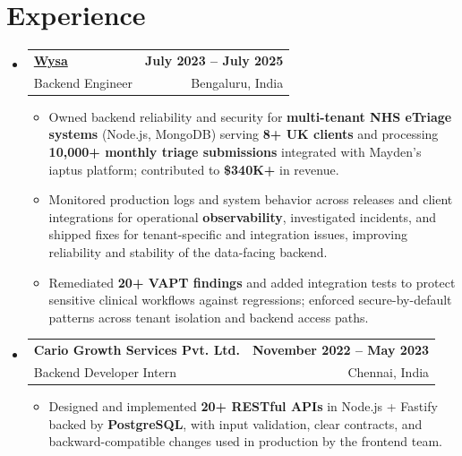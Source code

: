 \documentclass[letterpaper,10pt]{article}
\makeatletter
\newcommand{\resumeItem}[1]{
  \item\small{#1\vspace{-1pt}}
}
\newcommand{\resumeSubheading}[4]{
  \vspace{1pt}\item
    \begin{tabular*}{0.985\textwidth}[t]{l@{\extracolsep{\fill}}r}
      \textbf{#1} & \textbf{\small #2} \\
      {\small\color{ResumeSlate} #3} & {\small\color{ResumeSlate} #4} \\
    \end{tabular*}\vspace{-6pt}
}
\newcommand{\resumeSubHeadingListStart}{\begin{itemize}[leftmargin=0.0in, label={}, itemsep=2pt, topsep=2pt]}
\newcommand{\resumeSubHeadingListEnd}{\end{itemize}}
\newcommand{\resumeItemListStart}{\begin{itemize}[leftmargin=0.18in, itemsep=2pt, topsep=1pt]}
\newcommand{\resumeItemListEnd}{\end{itemize}\vspace{-4pt}}
\makeatother
\begin{document}
\section{Experience}
\resumeSubHeadingListStart
  \resumeSubheading
    {\href{https://www.wysa.io}{Wysa}}{July 2023 -- July 2025}
    {Backend Engineer}{Bengaluru, India}
    \resumeItemListStart
      \resumeItem{Owned backend reliability and security for \textbf{multi-tenant NHS eTriage systems} (Node.js, MongoDB) serving \textbf{8+ UK clients} and processing \textbf{10{,}000+ monthly triage submissions} integrated with Mayden's iaptus platform; contributed to \textbf{\$340K+} in revenue.}
      \resumeItem{Monitored production logs and system behavior across releases and client integrations for operational \textbf{observability}, investigated incidents, and shipped fixes for tenant-specific and integration issues, improving reliability and stability of the data-facing backend.}
      \resumeItem{Remediated \textbf{20+ VAPT findings} and added integration tests to protect sensitive clinical workflows against regressions; enforced secure-by-default patterns across tenant isolation and backend access paths.}
    \resumeItemListEnd
  \resumeSubheading
    {Cario Growth Services Pvt. Ltd.}{November 2022 -- May 2023}
    {Backend Developer Intern}{Chennai, India}
    \resumeItemListStart
      \resumeItem{Designed and implemented \textbf{20+ RESTful APIs} in Node.js + Fastify backed by \textbf{PostgreSQL}, with input validation, clear contracts, and backward-compatible changes used in production by the frontend team.}
    \resumeItemListEnd
\resumeSubHeadingListEnd
\vspace{-4pt}
\end{document}
